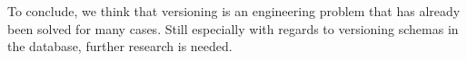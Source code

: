 
To conclude, we think that versioning is an engineering problem that has already been solved for many cases. Still especially with regards to versioning schemas in the database, further research is needed.

%
%
%

